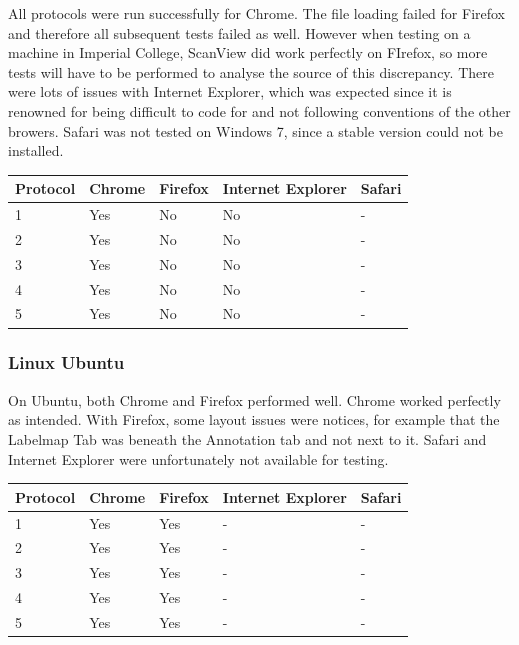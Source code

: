 \documentclass[a4paper,11pt,twoside]{article}
\begin{document}
All protocols were run successfully for Chrome. The file loading failed for Firefox and therefore all subsequent tests failed as well. However when testing on a machine in Imperial College, ScanView did work perfectly on FIrefox, so more tests will have to be performed to analyse the source of this discrepancy. There were lots of issues with Internet Explorer, which was expected since it is renowned for being difficult to code for and not following conventions of the other browers. Safari was not tested on Windows 7, since a stable version could not be installed.

\begin{center}

  \begin{tabular}{ | l || l | l | l | l |}
    \hline
    Protocol & Chrome & Firefox & Internet Explorer & Safari \\ \hline \hline
    1 & Yes & No  & No  & - \\ \hline
    2 & Yes & No & No & - \\ \hline
    3 & Yes & No & No & - \\ \hline
    4 & Yes & No & No & - \\ \hline
    5 & Yes & No & No & - \\
    \hline
  \end{tabular}

\end{center}

\subsubsection*{Linux Ubuntu}

On Ubuntu, both Chrome and Firefox performed well. Chrome worked perfectly as intended. With Firefox, some layout issues were notices, for example that the Labelmap Tab was beneath the Annotation tab and not next to it. Safari and Internet Explorer were unfortunately not available for testing.

\begin{center}

  \begin{tabular}{ | l || l | l | l | l |}
    \hline
    Protocol & Chrome & Firefox & Internet Explorer & Safari \\ \hline \hline
    1 & Yes & Yes  & -  & - \\ \hline
    2 & Yes & Yes & - & - \\ \hline
    3 & Yes & Yes & - & - \\ \hline
    4 & Yes & Yes & - & - \\ \hline
    5 & Yes & Yes & - & - \\
    \hline
  \end{tabular}

\end{center}
\end{document}
